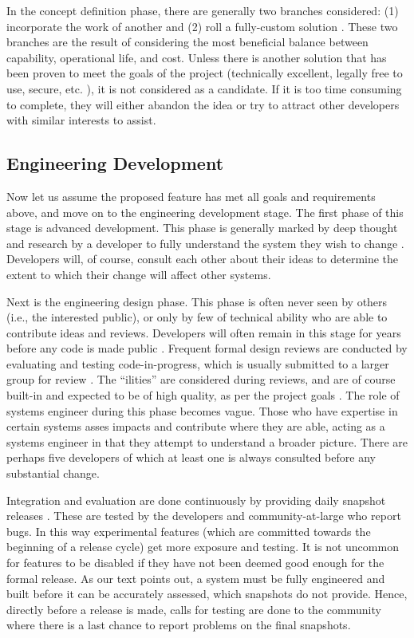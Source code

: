 \documentclass[12pt]{article}
\begin{document}
{In the concept definition phase, there are generally two branches considered: (1) incorporate the work of another \cite{popa3d} and (2) roll a fully-custom solution \cite{lyrics35}. These two branches are the result of considering the most beneficial balance between capability, operational life, and cost. Unless there is another solution that has been proven to meet the goals of the project (technically excellent, legally free to use, secure, etc. \cite{goals}), it is not considered as a candidate. If it is too time consuming to complete, they will either abandon the idea or try to attract other developers with similar interests to assist.

\subsection*{Engineering Development}

Now let us assume the proposed feature has met all goals and requirements above, and move on to the engineering development stage. The first phase of this stage is advanced development. This phase is generally marked by deep thought and research by a developer to fully understand the system they wish to change \cite{malloc}. Developers will, of course, consult each other about their ideas to determine the extent to which their change will affect other systems.

Next is the engineering design phase. This phase is often never seen by others (i.e., the interested public), or only by few of technical ability who are able to contribute ideas and reviews. Developers will often remain in this stage for years before any code is made public \cite{malloc}. Frequent formal design reviews are conducted by evaluating and testing code-in-progress, which is usually submitted to a larger group for review \cite{otto-malloc}. The ``ilities'' are considered during reviews, and are of course built-in and expected to be of high quality, as per the project goals \cite{goals}. The role of systems engineer during this phase becomes vague. Those who have expertise in certain systems asses impacts and contribute where they are able, acting as a systems engineer in that they attempt to understand a broader picture. There are perhaps five developers of which at least one is always consulted before any substantial change.

Integration and evaluation are done continuously by providing daily snapshot releases \cite{lifecycle}. These are tested by the developers and community-at-large who report bugs. In this way experimental features (which are committed towards the beginning of a release cycle) get more exposure and testing. It is not uncommon for features to be disabled if they have not been deemed good enough for the formal release. As our text points out, a system must be fully engineered and built before it can be accurately assessed, which snapshots do not provide. Hence, directly before a release is made, calls for testing are done to the community where there is a last chance to report problems on the final snapshots\cite{pre-release}.

}
\end{document}
